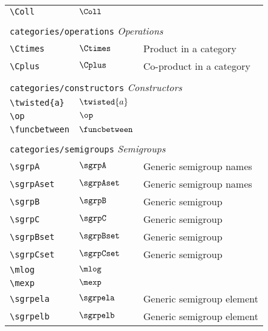 \begin{longtable}{lll}
 {\color[rgb]{0.5,0.5,0.5}\texttt{\textbackslash Coll}} & $\Coll$ & \\ 
  &  & \\ 
 \multicolumn{3}{l}{{\color[rgb]{0.5,0.5,0.5}\texttt{categories/operations}} \emph{Operations}}\\ 
 \hline
{\color[rgb]{0.5,0.5,0.5}\texttt{\textbackslash Ctimes}} & $\Ctimes$ &  Product in a category\\ 
 {\color[rgb]{0.5,0.5,0.5}\texttt{\textbackslash Cplus}} & $\Cplus$ &  Co-product in a category\\ 
  &  & \\ 
 \multicolumn{3}{l}{{\color[rgb]{0.5,0.5,0.5}\texttt{categories/constructors}} \emph{Constructors}}\\ 
 \hline
{\color[rgb]{0.5,0.5,0.5}\texttt{\textbackslash twisted\{a\}}} & $\twisted{a}$ & \\ 
 {\color[rgb]{0.5,0.5,0.5}\texttt{\textbackslash op}} & $\op$ & \\ 
 {\color[rgb]{0.5,0.5,0.5}\texttt{\textbackslash funcbetween}} & $\funcbetween$ & \\ 
  &  & \\ 
 \multicolumn{3}{l}{{\color[rgb]{0.5,0.5,0.5}\texttt{categories/semigroups}} \emph{Semigroups}}\\ 
 \hline
{\color[rgb]{0.5,0.5,0.5}\texttt{\textbackslash sgrpA}} & $\sgrpA$ &  Generic semigroup names\\ 
 {\color[rgb]{0.5,0.5,0.5}\texttt{\textbackslash sgrpAset}} & $\sgrpAset$ &  Generic semigroup names\\ 
 {\color[rgb]{0.5,0.5,0.5}\texttt{\textbackslash sgrpB}} & $\sgrpB$ &  Generic semigroup\\ 
 {\color[rgb]{0.5,0.5,0.5}\texttt{\textbackslash sgrpC}} & $\sgrpC$ &  Generic semigroup\\ 
 {\color[rgb]{0.5,0.5,0.5}\texttt{\textbackslash sgrpBset}} & $\sgrpBset$ &  Generic semigroup\\ 
 {\color[rgb]{0.5,0.5,0.5}\texttt{\textbackslash sgrpCset}} & $\sgrpCset$ &  Generic semigroup\\ 
 {\color[rgb]{0.5,0.5,0.5}\texttt{\textbackslash mlog}} & $\mlog$ & \\ 
 {\color[rgb]{0.5,0.5,0.5}\texttt{\textbackslash mexp}} & $\mexp$ & \\ 
 {\color[rgb]{0.5,0.5,0.5}\texttt{\textbackslash sgrpela}} & $\sgrpela$ &  Generic semigroup element\\ 
 {\color[rgb]{0.5,0.5,0.5}\texttt{\textbackslash sgrpelb}} & $\sgrpelb$ &  Generic semigroup element\\ 

\end{longtable}
